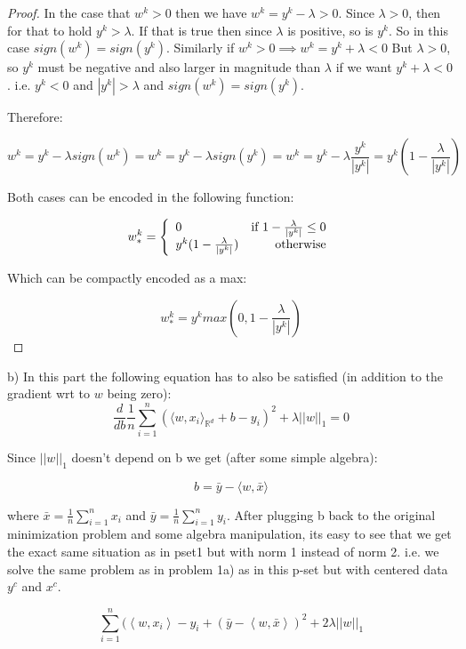 \documentclass[12pt]{report}
\begin{document}
\begin{proof}
In the case that $w^k > 0$ then we have $w^k =  y^k - \lambda > 0$. Since $\lambda > 0$, then for that to hold $y^k > \lambda$. If that is true then since $\lambda$ is positive, so is $y^k$. So in this case $sign(w^k) = sign(y^k)$. Similarly if $w^k > 0 \implies w^k =  y^k + \lambda < 0$ But $\lambda > 0$, so $y^k$ must be negative and also larger in magnitude than $\lambda$ if we want $ y^k + \lambda < 0$. i.e. $y^k < 0$ and $|y^k| > \lambda$ and $sign(w^k) = sign(y^k)$.

Therefore:

$$w^k =  y^k - \lambda sign(w^k) = w^k =  y^k - \lambda sign(y^k) = w^k = y^k - \lambda \frac{y^k}{|y^k|} = y^k (1- \frac{\lambda}{|y^k|} )$$

Both cases can be  encoded in the following function:

\begin{displaymath}
   w_*^k = \left\{
     \begin{array}{lr}
       0 & $if $  1- \frac{\lambda}{|y^k|} \leq 0\\
       y^k (1- \frac{\lambda}{|y^k|}) & $otherwise$ 
     \end{array}
   \right.
\end{displaymath}

Which can be compactly encoded as a max:

$$
\boxed{
w_*^k = y^k max(0, 1- \frac{\lambda}{|y^k|} )
}
$$
\end{proof}

b) In this part the following equation has to also be satisfied (in addition to the gradient wrt to $w$ being zero):
$$\frac{d}{db}\frac{1}{n}\sum_{i=1}^{n}(\langle w, x_i\rangle_{\mathbb{R}^d} +b - y_i)^2 + \lambda ||w||_1 = 0$$

Since $||w||_1$ doesn't depend on b we get (after some simple algebra):

$$b= \bar{y} -\langle w, \bar{x} \rangle$$

where $\bar{x} = \frac{1}{n}\sum^{n}_{i=1}x_i$ and $\bar{y} = \frac{1}{n}\sum^{n}_{i=1}y_i$. After plugging b back to the original minimization problem and some algebra manipulation, its easy to see that we get the exact same situation as in pset1 but with norm 1 instead of norm 2. i.e. we solve the same problem as in problem 1a) as in this p-set but with centered data $y^c$ and $x^c$.

$$ \sum_{i=1}^n ( \left\langle w, x_i \right\rangle - y_i + (\bar y -  \left\langle w, \bar x \right\rangle  ) ^2  + 2 \lambda ||w||_1$$
\end{document}
